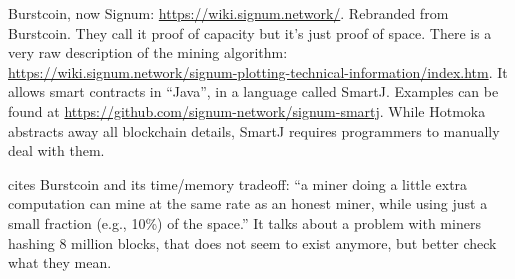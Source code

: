 
Burstcoin, now Signum: \url{https://wiki.signum.network/}. Rebranded from Burstcoin.
They call it proof of capacity but it's just proof of space.
There is a very raw description of the mining algorithm:
\url{https://wiki.signum.network/signum-plotting-technical-information/index.htm}.
It allows smart contracts in ``Java'', in a language called SmartJ. Examples
can be found at \url{https://github.com/signum-network/signum-smartj}.
While Hotmoka abstracts away all blockchain details, SmartJ requires programmers to
manually deal with them.

\cite{ParkKFGAP18} cites Burstcoin and its time/memory tradeoff:
``a miner doing a little extra computation can mine at the same
rate as an honest miner, while using just a small fraction (e.g., 10\%) of the space.''
It talks about a problem with miners hashing 8 million blocks, that does not seem to exist
anymore, but better check what they mean.
